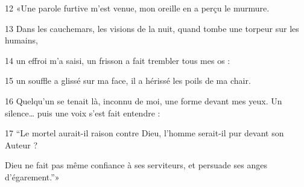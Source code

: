 
12 «Une parole furtive m’est venue, mon oreille en a perçu le murmure.

13 Dans les cauchemars, les visions de la nuit, quand tombe une torpeur sur les humains,

14 un effroi m’a saisi, un frisson a fait trembler tous mes os :

15 un souffle a glissé sur ma face, il a hérissé les poils de ma chair.

16 Quelqu’un se tenait là, inconnu de moi, une forme devant mes yeux. Un silence… puis une voix s’est fait entendre :

17 “Le mortel aurait-il raison contre Dieu, l’homme serait-il pur devant son Auteur ?

Dieu ne fait pas même confiance à ses serviteurs, et persuade ses anges d’égarement.”»
